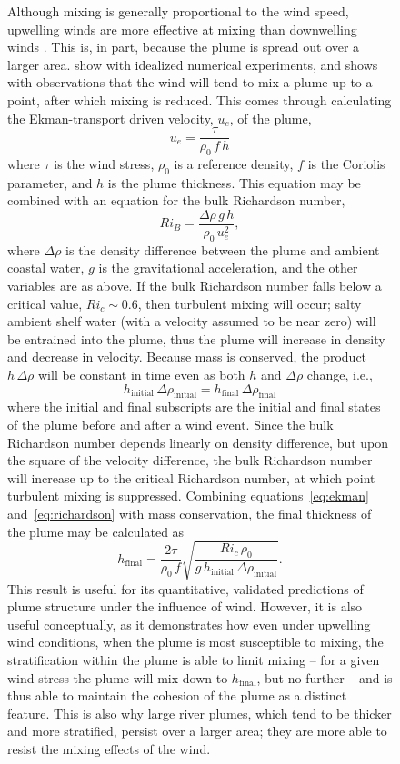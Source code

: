 \documentclass[11pt]{report}
\numberwithin{equation}{section}
\begin{document}
\begin{figure}
Although mixing is generally proportional to the wind speed, upwelling winds are more effective at mixing than downwelling winds \citep{hetland:05}.  This is, in part, because the plume is spread out over a larger area.  \citet{fong.geyer:01} show with idealized numerical experiments, and \citet{lentz:04} shows with observations that the wind will tend to mix a plume up to a point, after which mixing is reduced.  This comes through calculating the Ekman-transport driven velocity, $u_e$, of the plume,
\begin{equation}
    \label{eq:ekman}
    u_e = \frac{\tau}{\rho_0\,f\,h}
\end{equation}
where $\tau$ is the wind stress, $\rho_0$ is a reference density, $f$ is the Coriolis parameter, and $h$ is the plume thickness.  This equation may be combined with an equation for the bulk Richardson number,
\begin{equation}
    \label{eq:richardson}
    Ri_B = \frac{\Delta\rho\,g\,h}{\rho_0\,u_e^2},
\end{equation}
where $\Delta\rho$ is the density difference between the plume and ambient coastal water, $g$ is the gravitational acceleration, and the other variables are as above.
If the bulk Richardson number falls below a critical value, $Ri_c\sim0.6$, then turbulent mixing will occur; salty ambient shelf water (with a velocity assumed to be near zero) will be entrained into the plume, thus the plume will increase in density and decrease in velocity.  Because mass is conserved, the product $h\,\Delta\rho$ will be constant in time even as both $h$ and $\Delta\rho$ change, i.e., 
\begin{equation}
    h_{\mathrm{initial}}\,\Delta\rho_{\mathrm{initial}} = h_{\mathrm{final}}\,\Delta\rho_{\mathrm{final}}
\end{equation}
where the initial and final subscripts are the initial and final states of the plume before and after a wind event.  Since the bulk Richardson number depends linearly on density difference, but upon the square of the velocity difference, the bulk Richardson number will increase up to the critical Richardson number, at which point turbulent mixing is suppressed.  Combining equations~\ref{eq:ekman} and~\ref{eq:richardson} with mass conservation, the final thickness of the plume may be calculated \citep{fong.geyer:01, lentz:04, hetland:05b} as
\begin{equation}
    h_{\mathrm{final}} = \frac{2 \tau}{\rho_0\,f}\sqrt{\frac{Ri_c\,\rho_0}{g\,h_{\mathrm{initial}}\,\Delta\rho_{\mathrm{initial}}}}.
\end{equation}
This result is useful for its quantitative, validated predictions of plume structure under the influence of wind.  However, it is also useful conceptually, as it demonstrates how even under upwelling wind conditions, when the plume is most susceptible to mixing, the stratification within the plume is able to limit mixing -- for a given wind stress the plume will mix down to $h_{\mathrm{final}}$, but no further -- and is thus able to maintain the cohesion of the plume as a distinct feature.  This is also why large river plumes, which tend to be thicker and more stratified, persist over a larger area; they are more able to resist the mixing effects of the wind.


\end{figure}
\end{document}
